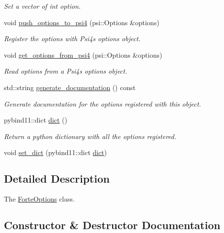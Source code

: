 \begin{DoxyCompactItemize}
\begin{DoxyCompactList}\small\item\em Set a vector of int option. \end{DoxyCompactList}\item 
void \mbox{\hyperlink{classforte_1_1_forte_options_af177038deb74406fa41ac29a024edde2}{push\+\_\+options\+\_\+to\+\_\+psi4}} (psi\+::\+Options \&options)
\begin{DoxyCompactList}\small\item\em Register the options with Psi4\textquotesingle{}s options object. \end{DoxyCompactList}\item 
void \mbox{\hyperlink{classforte_1_1_forte_options_a9e02372d36c9460f222769365ea44ac1}{get\+\_\+options\+\_\+from\+\_\+psi4}} (psi\+::\+Options \&options)
\begin{DoxyCompactList}\small\item\em Read options from a Psi4\textquotesingle{}s options object. \end{DoxyCompactList}\item 
std\+::string \mbox{\hyperlink{classforte_1_1_forte_options_a05b9f51a5169801e089c1cfed97d0f64}{generate\+\_\+documentation}} () const
\begin{DoxyCompactList}\small\item\em Generate documentation for the options registered with this object. \end{DoxyCompactList}\item 
pybind11\+::dict \mbox{\hyperlink{classforte_1_1_forte_options_a5674dbf2b9a7236c32b77e8c6534baad}{dict}} ()
\begin{DoxyCompactList}\small\item\em Return a python dictionary with all the options registered. \end{DoxyCompactList}\item 
void \mbox{\hyperlink{classforte_1_1_forte_options_acb7f135b08d1ca37633b6a7aa29917cf}{set\+\_\+dict}} (pybind11\+::dict \mbox{\hyperlink{classforte_1_1_forte_options_a5674dbf2b9a7236c32b77e8c6534baad}{dict}})
\end{DoxyCompactItemize}


\subsection{Detailed Description}
The \mbox{\hyperlink{classforte_1_1_forte_options}{Forte\+Options}} class. 

\subsection{Constructor \& Destructor Documentation}
\mbox{\label{classforte_1_1_forte_options_a0dc45f01fa34915601a959ee2da03fa3}} 
